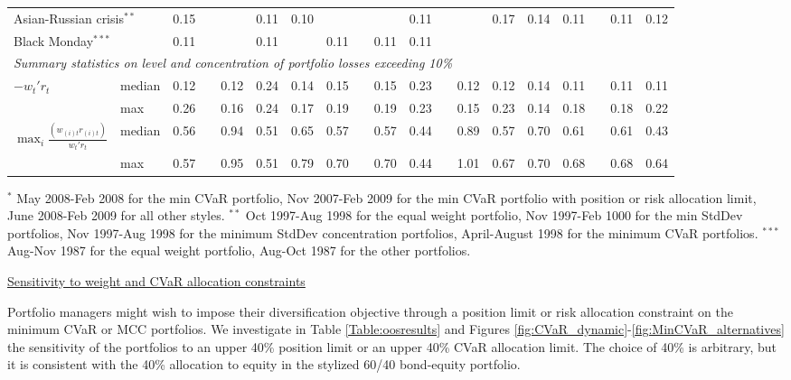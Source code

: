 \documentclass[12pt,a4paper]{article}
\begin{document}
\begin{landscape}
\begin{table}[tb]
\begin{center}
{\begin{tabular}{|lc c c cccc c cc c cccc c cc| }
 \multicolumn{2}{|l}{Asian-Russian crisis$^{**}$}& 0.15    & &  &  0.11    & 0.10 &      & &      & 0.11  &  &   & 0.17 & 0.14 &0.11 & &  0.11 & 0.12 \\ \multicolumn{2}{|l}{ Black Monday$^{***}$}	& 0.11 &  & &   0.11 &      & 0.11 & & 0.11 & 0.11 &  &   &  &      &      & &       &     \\
 \hline \multicolumn{19}{|l|}{ \emph{Summary statistics on level and concentration of portfolio losses exceeding 10\%}  }  \\
$-w_t'r_t$ & \multicolumn{1}{l}{ median}   &
  0.12 & &0.12 & 0.24 & 0.14 & 0.15 & &0.15 & 0.23 & & 0.12 & 0.12 & 0.14 & 0.11 & & 0.11 & 0.11     \\
&\multicolumn{1}{l}{  max  }    &
 0.26 & &0.16 & 0.24 & 0.17 & 0.19 & &0.19 & 0.23  & &  0.15 & 0.23 & 0.14 & 0.18 & &0.18 & 0.22      \\
$\max_i\frac{(w_{(i)t}r_{(i)t})}{w_t'r_t}$  & \multicolumn{1}{l}{ median}   &
0.56 && 0.94 & 0.51 & 0.65 & 0.57 && 0.57 & 0.44   & & 0.89 & 0.57 & 0.70 & 0.61 && 0.61 & 0.43  \\
         & \multicolumn{1}{l}{ max  }    &
 0.57 & &0.95 & 0.51 & 0.79 & 0.70 && 0.70 & 0.44& &   1.01 & 0.67 & 0.70 & 0.68 & &0.68 & 0.64   \\  \hline
\end{tabular}
}
\end{center}



{\scriptsize $^{*}$ May 2008-Feb 2008 for the min CVaR portfolio, Nov 2007-Feb 2009 for the min CVaR portfolio with position or risk allocation limit, June 2008-Feb 2009 for all other styles.  $^{**}$ Oct 1997-Aug 1998 for the equal weight portfolio, Nov 1997-Feb 1000 for the min StdDev portfolios, Nov 1997-Aug 1998 for the minimum StdDev concentration portfolios, April-August 1998 for the minimum CVaR portfolios. $^{***}$ Aug-Nov 1987 for the equal weight portfolio, Aug-Oct 1987 for the other portfolios. }
\end{table}
\end{landscape}


\medskip

\underline{Sensitivity to weight and CVaR allocation constraints}


Portfolio managers might wish to impose their diversification objective through a position limit or risk allocation constraint on the minimum CVaR or MCC portfolios. We investigate in Table \ref{Table:oosresults} and Figures \ref{fig:CVaR_dynamic}-\ref{fig:MinCVaR_alternatives} the sensitivity of the portfolios to an upper 40\% position limit or an upper 40\% CVaR allocation limit. The choice of 40\% is arbitrary, but it is consistent with the 40\% allocation to equity in the stylized 60/40 bond-equity portfolio.
\end{document}
